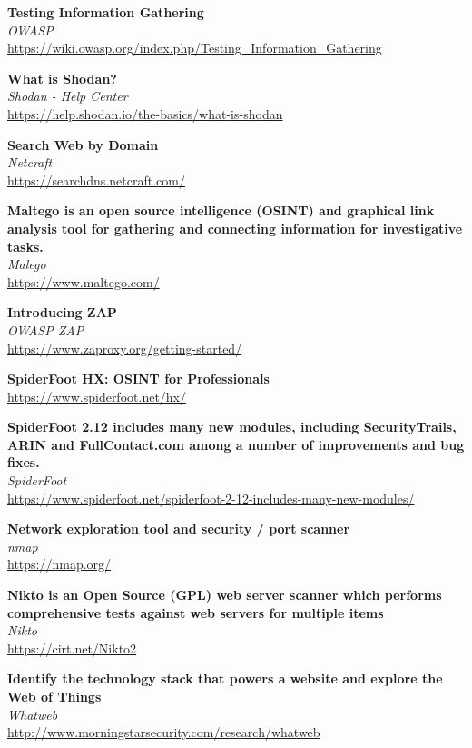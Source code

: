 \documentclass[10pt,a4paper]{article}
\begin{document}
\begin{thebibliography}{9}

	\textbf{Testing Information Gathering}\\
	\textit{OWASP}\\
	\url{https://wiki.owasp.org/index.php/Testing_Information_Gathering}

	\textbf{What is Shodan?}\\
	\textit{Shodan - Help Center}\\
	\url{https://help.shodan.io/the-basics/what-is-shodan}

	\textbf{Search Web by Domain}\\
	\textit{Netcraft}\\
	\url{https://searchdns.netcraft.com/}
	
	\textbf{Maltego is an open source intelligence (OSINT) and graphical link analysis tool for gathering and connecting information for investigative tasks.}\\
	\textit{Malego}\\
	\url{https://www.maltego.com/}
	
	\textbf{Introducing ZAP}\\
	\textit{OWASP ZAP}\\
	\url{https://www.zaproxy.org/getting-started/}

	\textbf{SpiderFoot HX: OSINT for Professionals}\\
	\url{https://www.spiderfoot.net/hx/}
	
	\textbf{SpiderFoot 2.12 includes many new modules, including SecurityTrails, ARIN and FullContact.com among a number of improvements and bug fixes.}\\
	\textit{SpiderFoot}\\
	\url{https://www.spiderfoot.net/spiderfoot-2-12-includes-many-new-modules/}

	\textbf{Network exploration tool and security / port scanner}\\
	\textit{nmap}\\
	\url{https://nmap.org/}

	\textbf{Nikto is an Open Source (GPL) web server scanner which performs comprehensive tests against web servers for multiple items}\\
	\textit{Nikto}\\
	\url{https://cirt.net/Nikto2}

	\textbf{Identify the technology stack that powers a website and explore the Web of Things}\\
	\textit{Whatweb}\\
	\url{http://www.morningstarsecurity.com/research/whatweb}


\end{thebibliography}
\end{document}

